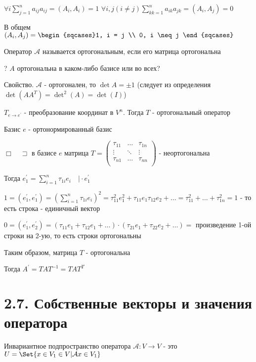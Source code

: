 \documentclass[12pt]{article}
\begin{document}
    $\forall i \sum^n_{j=1} a_{ij} a_{ij} = (A_i, A_i) = 1$
    $\forall i, j (i \neq j) \sum^n_{kk=1} a_{ik} a_{jk} = (A_i, A_j) = 0$

    В общем $(A_i, A_j) = \begin{sqcases}1, i = j \\ 0, i \neq j \end{sqcases}$

    \Def Оператор $\mathcal{A}$ называется ортогональным, если его матрица ортогональна

    ? $A$ ортогональна в каком-либо базисе или во всех?

    Свойство. $\mathcal{A}$ - ортогонален, то $\det A = \pm 1$ (следует из определения $\det(AA^T) = \det^2(A) = \det(I)$)

    \Th $T_{e\to e^\prime}$ - преобразование координат в $V^n$. Тогда $T$ - ортогональный оператор

    Базис $e$ - ортонормированный базис

    $\Box \quad \sqsupset $ в базисе $e$ матрица $T = \begin{pmatrix}
          \tau_{11} & \dots & \tau_{1n} \\
          \vdots & \ddots & \vdots \\
          \tau_{n1} & \dots & \tau_{nn} \\
    \end{pmatrix}$ - неортогональна

    Тогда $e_1^\prime = \sum_{i=1}^n \tau_{1i} e_i \quad \Big| \cdot e_1^\prime$

    $1 = (e_1^\prime, e_1^\prime) = (\sum_{i=1}^n \tau_{1i} e_i)^2 =
    \tau^2_{11} e^2_1 + \tau_{11} e_1 \tau_{12} e_2 + \dots = \tau_{11}^2 + \dots + \tau_{1n}^2 = 1$ - то есть строка - единичный вектор

    $0 = (e_1^\prime, e_2^\prime) = (\tau_{11} e_1 + \tau_{12}e_1 + \dots) \cdot
    (\tau_{21}e_1 + \tau_{22}e_2 + \dots) = $ произведение 1-ой строки на 2-ую, то есть строки ортогональны

    Таким образом, матрица $T$ - ортогональна

    \Nota Тогда $A^\prime = T A T^{-1} = T A T^T$

    \section{2.7. Собственные векторы и значения оператора}

    \Def Инвариантное подпространство оператора $\mathcal{A} : V \rightarrow V$ -
    это $U = \Set{x \in V_1 \in V | \mathcal{A}x \in V_1}$
\end{document}
